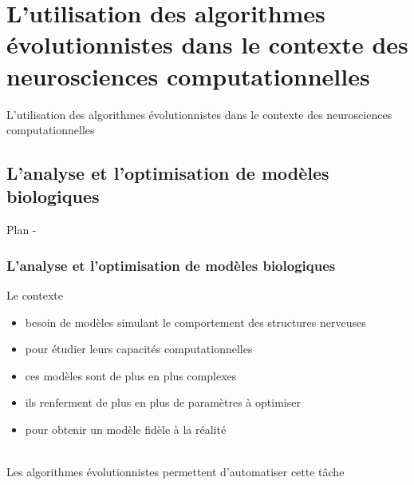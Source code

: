 \documentclass{beamer}
\begin{document}

\section{L'utilisation des algorithmes évolutionnistes dans le contexte des neurosciences computationnelles}
\begin{frame}
\begin{center}
{\LARGE L'utilisation des algorithmes évolutionnistes dans le contexte des neurosciences computationnelles}
\end{center}
\end{frame}

\subsection{L'analyse et l'optimisation de modèles biologiques}

\begin{frame}{Plan - \secname}
    \tableofcontents[sectionstyle=hide/hide,subsectionstyle=show/shaded/hide ]
\end{frame}


\begin{frame}
\frametitle{L'analyse et l'optimisation de modèles biologiques}
Le contexte
\begin{itemize}
    \item besoin de modèles simulant le comportement des structures nerveuses
    \item pour étudier leurs capacités computationnelles
    \item ces modèles sont de plus en plus complexes
    \item ils renferment de plus en plus de paramètres à optimiser
    \item pour obtenir un modèle fidèle à la réalité
\end{itemize}
~\\
Les algorithmes évolutionnistes permettent d'automatiser cette tâche
\end{frame}
\end{document}
